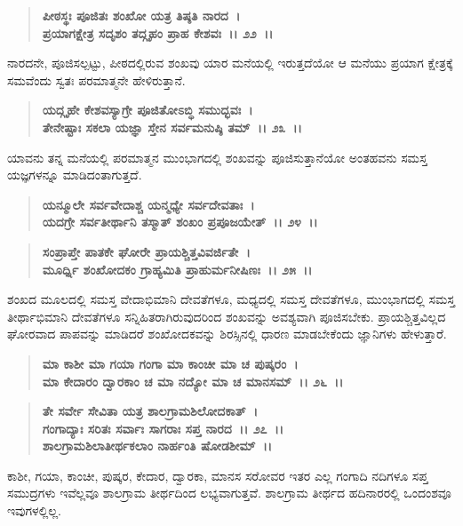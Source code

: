 \begin{verse}
\textbf{ಪೀಠಸ್ಥಃ ಪೂಜಿತಃ ಶಂಖೋ ಯತ್ರ ತಿಷ್ಠತಿ ನಾರದ~।}\\\textbf{ಪ್ರಯಾಗಕ್ಷೇತ್ರ ಸದೃಶಂ ತದ್ಗೃಹಂ ಪ್ರಾಹ ಕೇಶವಃ~।। ೨೨~।।}
\end{verse}

ನಾರದನೇ, ಪೂಜಿಸಲ್ಪಟ್ಟು, ಪೀಠದಲ್ಲಿರುವ ಶಂಖವು ಯಾರ ಮನೆಯಲ್ಲಿ ಇರುತ್ತದೆಯೋ ಆ ಮನೆಯು ಪ್ರಯಾಗ ಕ್ಷೇತ್ರಕ್ಕೆ ಸಮವೆಂದು ಸ್ವತಃ ಪರಮಾತ್ಮನೇ ಹೇಳಿರುತ್ತಾನೆ.

\begin{verse}
\textbf{ಯದ್ಗೃಹೇ ಕೇಶವಸ್ಯಾಗ್ರೇ ಪೂಜಿತೋಽಬ್ಧಿ ಸಮುದ್ಭವಃ~।}\\\textbf{ತೇನೇಷ್ಟಾಃ ಸಕಲಾ ಯಜ್ಞಾ ಸ್ತೇನ ಸರ್ವಮನುಷ್ಠಿ ತಮ್~।। ೨೩~।।}
\end{verse}

ಯಾವನು ತನ್ನ ಮನೆಯಲ್ಲಿ ಪರಮಾತ್ಮನ ಮುಂಭಾಗದಲ್ಲಿ ಶಂಖವನ್ನು ಪೂಜಿಸುತ್ತಾನೆಯೋ ಅಂತಹವನು ಸಮಸ್ತ ಯಜ್ಞಗಳನ್ನೂ ಮಾಡಿದಂತಾಗುತ್ತದೆ.

\begin{verse}
\textbf{ಯನ್ಮೂಲೇ ಸರ್ವವೇದಾಶ್ಚ ಯನ್ಮಧ್ಯೇ ಸರ್ವದೇವತಾಃ~।}\\\textbf{ಯದಗ್ರೇ ಸರ್ವತೀರ್ಥಾನಿ ತಸ್ಮಾತ್ ಶಂಖಂ ಪ್ರಪೂಜಯೇತ್~।। ೨೪~।। }
\end{verse}

\begin{verse}
\textbf{ಸಂಪ್ರಾಪ್ತೇ ಪಾತಕೇ ಘೋರೇ ಪ್ರಾಯಶ್ಚಿತ್ತವಿವರ್ಜಿತೇ~।}\\\textbf{ಮೂರ್ಧ್ನಿ ಶಂಖೋದಕಂ ಗ್ರಾಹ್ಯಮಿತಿ ಪ್ರಾಹುರ್ಮನೀಷಿಣಃ~।। ೨೫~।।}
\end{verse}

ಶಂಖದ ಮೂಲದಲ್ಲಿ ಸಮಸ್ತ ವೇದಾಭಿಮಾನಿ ದೇವತೆಗಳೂ, ಮಧ್ಯದಲ್ಲಿ ಸಮಸ್ತ ದೇವತೆಗಳೂ, ಮುಂಭಾಗದಲ್ಲಿ ಸಮಸ್ತ ತೀರ್ಥಾಭಿಮಾನಿ ದೇವತೆಗಳೂ ಸನ್ನಿಹಿತರಾಗಿರುವುದರಿಂದ ಶಂಖವನ್ನು ಅವಶ್ಯವಾಗಿ ಪೂಜಿಸಬೇಕು. ಪ್ರಾಯಶ್ಚಿತ್ತವಿಲ್ಲದ ಘೋರವಾದ ಪಾಪವನ್ನು ಮಾಡಿದರೆ ಶಂಖೋದಕವನ್ನು ಶಿರಸ್ಸಿನಲ್ಲಿ ಧಾರಣ ಮಾಡಬೇಕೆಂದು ಜ್ಞಾನಿಗಳು ಹೇಳುತ್ತಾರೆ.

\begin{verse}
\textbf{ಮಾ ಕಾಶೀ ಮಾ ಗಯಾ ಗಂಗಾ ಮಾ ಕಾಂಚೀ ಮಾ ಚ ಪುಷ್ಕರಂ~।}\\\textbf{ಮಾ ಕೇದಾರಂ ದ್ವಾರಕಾಂ ಚ ಮಾ ನದ್ಯೋ ಮಾ ಚ ಮಾನಸಮ್~।। ೨೬~।।} 
\end{verse}

\begin{verse}
\textbf{ತೇ ಸರ್ವೇ ಸೇವಿತಾ ಯತ್ರ ಶಾಲಗ್ರಾಮಶಿಲೋದಕಾತ್~।}\\\textbf{ಗಂಗಾದ್ಯಾಃ ಸರಿತಃ ಸರ್ವಾಃ ಸಾಗರಾಃ ಸಪ್ತ ನಾರದ~।। ೨೭~।।} \\\textbf{ಶಾಲಗ್ರಾಮಶಿಲಾತೀರ್ಥಕಲಾಂ ನಾರ್ಹಂತಿ ಷೋಡಶೀಮ್~।।}
\end{verse}

ಕಾಶೀ, ಗಯಾ, ಕಾಂಚೀ, ಪುಷ್ಕರ, ಕೇದಾರ, ದ್ವಾರಕಾ, ಮಾನಸ ಸರೋವರ ಇತರ ಎಲ್ಲ ಗಂಗಾದಿ ನದಿಗಳೂ ಸಪ್ತ ಸಮುದ್ರಗಳು ಇವೆಲ್ಲವೂ ಶಾಲಗ್ರಾಮ ತೀರ್ಥದಿಂದ ಲಭ್ಯವಾಗುತ್ತವೆ. ಶಾಲಗ್ರಾಮ ತೀರ್ಥದ ಹದಿನಾರರಲ್ಲಿ ಒಂದಂಶವೂ ಇವುಗಳಲ್ಲಿಲ್ಲ.

